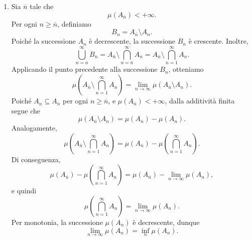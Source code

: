 \documentclass[a4paper]{article}
\begin{document}
\begin{radioactive}
\begin{snippetproof}{}
\begin{enumerate}
        \item
            Sia \(\overline n\) tale che
            \[
                \mu(A_{\overline n}) < +\infty.
            \]
            Per ogni \(n \geq \overline n\), definiamo
            \[
                B_n = A_{\overline n} \setminus A_n.
            \]
            Poiché la successione \(A_n\) è decrescente, la successione \(B_n\)
            è crescente. Inoltre,
            \[
                \bigcup_{n=\overline n}^{\infty} B_n
                =
                A_{\overline n}
                \setminus
                \bigcap_{n=\overline n}^{\infty} A_n
                =
                A_{\overline n}
                \setminus
                \bigcap_{n=1}^{\infty} A_n.
            \]
            Applicando il punto precedente alla successione \(B_n\), otteniamo
            \[
                \mu\left(
                    A_{\overline n}
                    \setminus
                    \bigcap_{n=1}^{\infty} A_n
                \right)
                =
                \lim_{n \to \infty}
                \mu(A_{\overline n} \setminus A_n).
            \]
            Poiché \(A_n \subseteq A_{\overline n}\) per ogni
            \(n \geq \overline n\), e \(\mu(A_{\overline n}) < +\infty\),
            dalla additività finita segue che
            \[
                \mu(A_{\overline n} \setminus A_n)
                =
                \mu(A_{\overline n}) - \mu(A_n).
            \]
            Analogamente,
            \[
                \mu\left(
                    A_{\overline n}
                    \setminus
                    \bigcap_{n=1}^{\infty} A_n
                \right)
                =
                \mu(A_{\overline n})
                -
                \mu\left(
                    \bigcap_{n=1}^{\infty} A_n
                \right).
            \]
            Di conseguenza,
            \[
                \mu(A_{\overline n})
                -
                \mu\left(
                    \bigcap_{n=1}^{\infty} A_n
                \right)
                =
                \mu(A_{\overline n})
                -
                \lim_{n \to \infty} \mu(A_n),
            \]
            e quindi
            \[
                \mu\left(
                    \bigcap_{n=1}^{\infty} A_n
                \right)
                =
                \lim_{n \to \infty} \mu(A_n).
            \]
            Per monotonia, la successione \(\mu(A_n)\) è decrescente, dunque
            \[
                \lim_{n \to \infty} \mu(A_n)
                =
                \inf_n \mu(A_n).
            \]
    \end{enumerate}
\end{snippetproof}
\end{radioactive}
\end{document}
